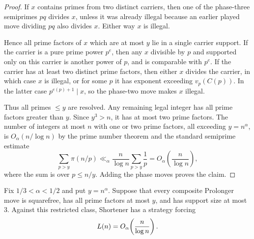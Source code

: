 \begin{proof}
If $x$ contains primes from two distinct carriers, then one of the phase-three
semiprimes $pq$ divides $x$, unless it was already illegal because an earlier
played move dividing $pq$ also divides $x$.  Either way $x$ is illegal.

Hence all prime factors of $x$ which are at most $y$ lie in a single carrier
support.  If the carrier is a pure prime power $p^e$, then any $x$ divisible by
$p$ and supported only on this carrier is another power of $p$, and is
comparable with $p^e$.  If the carrier has at least two distinct prime factors,
then either $x$ divides the carrier, in which case $x$ is illegal, or for some
$p$ it has exponent exceeding $v_p(C(p))$.  In the latter case
$p^{e(p)+1}\mid x$, so the phase-two move makes $x$ illegal.

Thus all primes $\le y$ are resolved.  Any remaining legal integer has all
prime factors greater than $y$.  Since $y^3>n$, it has at most two prime
factors.  The number of integers at most $n$ with one or two prime factors,
all exceeding $y=n^\alpha$, is $O_\alpha(n/\log n)$ by the prime number theorem
and the standard semiprime estimate
\[
  \sum_{p>y}\pi(n/p)\ll_\alpha \frac n{\log n}\sum_{p>y}\frac1p
  =O_\alpha\!\left(\frac n{\log n}\right),
\]
where the sum is over $p\le n/y$.  Adding the phase moves proves the claim.
\end{proof}

\begin{proposition}\label{prop:rank-three-carriers}
Fix $1/3<\alpha<1/2$ and put $y=n^\alpha$.  Suppose that every composite
Prolonger move is squarefree, has all prime factors at most $y$, and has
support size at most $3$.  Against this restricted class, Shortener has a
strategy forcing
\[
  L(n)=O_\alpha\!\left(\frac n{\log n}\right).
\]
\end{proposition}


